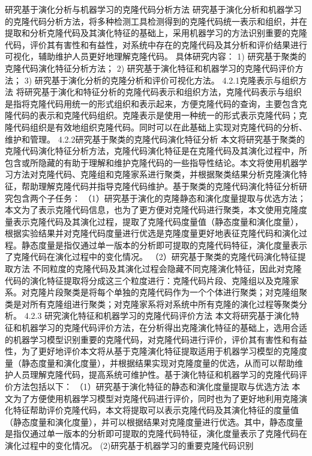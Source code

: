 
研究基于演化分析与机器学习的克隆代码分析方法
研究基于演化分析和机器学习的克隆代码分析方法，将多种检测工具检测得到的克隆代码统一表示和组织，并在提取和分析克隆代码及其演化特征的基础上，采用机器学习的方法识别重要的克隆代码，评价其有害性和有益性，对系统中存在的克隆代码及其分析和评价结果进行可视化，辅助维护人员更好地理解克隆代码。
具体研究内容：
1)	研究基于聚类的克隆代码演化特征分析方法；
2)	研究基于演化特征和机器学习的克隆代码评价方法；
3)	研究基于演化分析的克隆分析和评价可视化方法。
4.2.1克隆表示与组织方法
将研究基于演化和特征分析的克隆代码表示和组织方法，克隆代码表示与组织是指将克隆代码用统一的形式组织和表示起来，方便克隆代码的查询，主要包含克隆代码的表示和克隆代码组织。克隆表示是使用一种统一的形式表示克隆代码；克隆代码组织是有效地组织克隆代码。同时可以在此基础上实现对克隆代码的分析、维护和管理。
4.2.2研究基于聚类的克隆代码演化特征分析
本文将研究基于聚类的克隆代码演化特征分析方法，克隆代码演化特征是在克隆代码及其演化过程中，所包含或所隐藏的有助于理解和维护克隆代码的一些指导性结论。本文将使用机器学习方法对克隆代码、克隆组和克隆家系进行聚类，并根据聚类结果分析克隆演化特征，帮助理解克隆代码并指导克隆代码维护。基于聚类的克隆代码演化特征分析研究包含两个子任务：
（1）研究基于演化的克隆静态和演化度量提取与优选方法；
本文为了表示克隆代码信息，也为了更方便对克隆代码进行聚类，本文使用克隆度量表示克隆代码及其演化过程，提取了克隆代码度量值（静态度量和演化度量），根据实验结果并对克隆代码度量进行优选是克隆度量更好地表征克隆代码和演化过程。静态度量是指仅通过单一版本的分析即可提取的克隆代码特征，演化度量表示了克隆代码在演化过程中的变化情况。
（2）研究基于聚类的克隆代码演化特征提取方法
不同粒度的克隆代码及其演化过程会隐藏不同克隆演化特征，因此对克隆代码的演化特征提取将分成这三个粒度进行：克隆代码片段、克隆组以及克隆家系。对克隆片段聚类是将每个单独的克隆代码作为一个个体进行聚类；对克隆组聚类是对所有克隆组进行聚类；对克隆家系将对系统中所有克隆的演化过程等聚类分析。
4.2.3 研究演化特征和机器学习的克隆代码评价方法
本文将研究基于演化特征和机器学习的克隆代码评价方法，在分析得出克隆演化特征的基础上，选用合适的机器学习模型识别重要的克隆代码，对克隆代码进行评价，评价其有害性和有益性，为了更好地评价本文将从基于克隆演化特征提取适用于机器学习模型的克隆度量（静态度量和演化度量），并根据结果实现对克隆度量的优选，从而可以帮助维护人员理解克隆代码，提高系统可维护性。基于演化特征和机器学习的克隆代码评价方法包括以下：
（1）研究基于演化特征的静态和演化度量提取与优选方法
本文为了方便使用机器学习模型对克隆代码进行评价，同时也为了更好地利用克隆演化特征帮助评价克隆代码，本文将提取可以表示克隆代码及其演化特征的度量值（静态度量和演化度量），并可以根据结果对克隆度量进行优选。其中，静态度量是指仅通过单一版本的分析即可提取的克隆代码特征，演化度量表示了克隆代码在演化过程中的变化情况。
(2)研究基于机器学习的重要克隆代码识别

